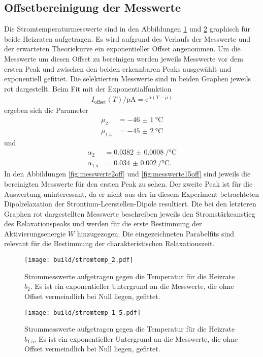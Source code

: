 \subsection{Offsetbereinigung der Messwerte}

Die Stromtemperaturmesswerte sind in den Abbildungen \ref{fig:messwerte2} und
\ref{fig:messwerte15} graphisch für beide Heizraten aufgetragen. Es wird
aufgrund des Verlaufs der Messwerte und der erwarteten Theoriekurve ein
exponentieller Offset angenommen. Um die Messwerte um diesen Offset zu bereinigen
werden jeweils Messwerte vor dem ersten Peak und zwischen den beiden erkennbaren
Peaks ausgewählt und exponentiell gefittet. Die selektierten Messwerte sind in beiden
Graphen jeweils rot dargestellt. Beim Fit mit der Exponentialfunktion
\begin{align}
  I_\text{offset}(T)/\si{\pico\ampere} = \mathrm{e}^{\alpha(T-\mu)}
\end{align}
ergeben sich die Parameter
\begin{align}
  \mu_{2} &= \SI{-46(1)}{\celsius} \\
  \mu_{1.5} &= \SI{-45(2)}{\celsius}
\end{align}
und
\begin{align}
  \alpha_{2} &= \SI{0.0382(8)}{\per\celsius} \\
  \alpha_{1.5} &= \SI{0.034(2)}{\per\celsius}.
\end{align}
In den Abbildungen \ref{fig:messwerte2off} und \ref{fig:messwerte15off} sind
jeweils die bereinigten Messwerte für den ersten Peak zu sehen. Der zweite Peak ist
für die Auswertung uninteressant, da er nicht aus der in diesem Experiment
betrachteten Dipolrelaxation der Strontium-Leerstellen-Dipole resultiert.
Die bei den letzteren Graphen rot dargestellten Messwerte beschreiben jeweils den
Stromstärkeanstieg des Relaxationspeaks und werden für die erste Bestimmung der
Aktivierungsenergie $W$ hinzugezogen. Die eingezeichneten Parabelfits sind relevant
für die Bestimmung der charakteristischen Relaxationszeit.

\begin{figure}
  \centering
  \texttt{[image: build/stromtemp\_2.pdf]}
  \caption{Strommesswerte aufgetragen gegen die Temperatur für die Heizrate $b_{2}$. Es ist ein exponentieller
  Untergrund an die Messwerte, die ohne Offset vermeindlich bei Null liegen, gefittet.}
  \label{fig:messwerte2}
\end{figure}

\begin{figure}
  \centering
  \texttt{[image: build/stromtemp\_1\_5.pdf]}
  \caption{Strommesswerte aufgetragen gegen die Temperatur für die Heizrate $b_{1.5}$. Es ist ein exponentieller
  Untergrund an die Messwerte, die ohne Offset vermeindlich bei Null liegen, gefittet.}
  \label{fig:messwerte15}
\end{figure}

